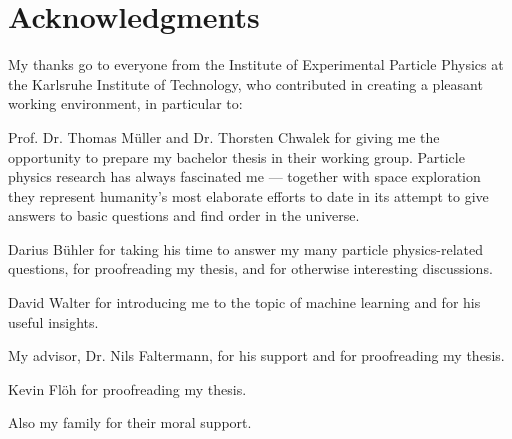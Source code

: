\chapter*{Acknowledgments}

My thanks go to everyone from the Institute of Experimental Particle Physics at the Karlsruhe Institute of Technology, who contributed in creating a pleasant working environment, in particular to:

Prof. Dr. Thomas Müller and Dr. Thorsten Chwalek for giving me the opportunity to prepare my bachelor thesis in their working group. Particle physics research has always fascinated me --- together with space exploration they represent humanity's most elaborate efforts to date in its attempt to give answers to basic questions and find order in the universe.

Darius Bühler for taking his time to answer my many particle physics-related questions, for proofreading my thesis, and for otherwise interesting discussions.

David Walter for introducing me to the topic of machine learning and for his useful insights.

My advisor, Dr. Nils Faltermann, for his support and for proofreading my thesis.

Kevin Flöh for proofreading my thesis.

Also my family for their moral support.
